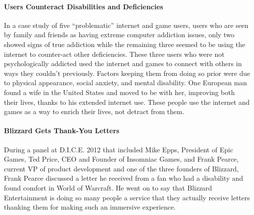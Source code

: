 \documentclass[11pt]{article}
\begin{document}
\begin{multicols}{2}
\paragraph{Users Counteract Disabilities and Deficiencies\\}
In a case study of five ``problematic'' internet and game users, users who are seen by family and friends as having extreme computer addiction issues, only two showed signs of true addiction while the remaining three seemed to be using the internet to counter-act other deficiencies. \cite{IsThereEvidenceOfInternetAddiction} These three users who were not psychologically addicted used the internet and games to connect with others in ways they couldn't previously. Factors keeping them from doing so prior were due to physical appearance, social anxiety, and mental disability. One European man found a wife in the United States and moved to be with her, improving both their lives, thanks to his extended internet use. \cite{IsThereEvidenceOfInternetAddiction} These people use the internet and games as a way to enrich their lives, not detract from them.

\paragraph{Blizzard Gets Thank-You Letters\\}
During a panel at D.I.C.E. 2012 \cite{DICEInterview} that included Mike Epps, President of Epic Games, Ted Price, CEO and Founder of Insomniac Games, and Frank Pearce, current VP of product development and one of the three founders of Blizzard, Frank Pearce discussed a letter he received from a fan who had a disability and found comfort in World of Warcraft. He went on to say that Blizzard Entertainment is doing so many people a service that they actually receive letters thanking them for making such an immersive experience. \cite{DICEInterview}


\end{multicols}
\end{document}
